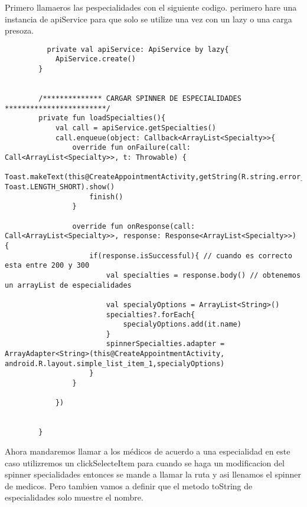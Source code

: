 \documentclass[a4paper]{article}
\begin{document}
	Primero llamaeros las pespecialidades con el siguiente codigo. perimero hare una instancia de apiService para que solo se utilize una vez con un lazy o una carga presoza.
	

		\lstset{style=mystyle,caption=Spinner de especialidades,label=DescriptiveLabel}
	\begin{lstlisting}
		  private val apiService: ApiService by lazy{
			ApiService.create()
		}
		
		
		/************** CARGAR SPINNER DE ESPECIALIDADES ************************/
		private fun loadSpecialties(){
			val call = apiService.getSpecialties()
			call.enqueue(object: Callback<ArrayList<Specialty>>{
				override fun onFailure(call: Call<ArrayList<Specialty>>, t: Throwable) {
					Toast.makeText(this@CreateAppointmentActivity,getString(R.string.error_loading_speialties), Toast.LENGTH_SHORT).show()
					finish()
				}
				
				override fun onResponse(call: Call<ArrayList<Specialty>>, response: Response<ArrayList<Specialty>>) {
					if(response.isSuccessful){ // cuando es correcto esta entre 200 y 300
						val specialties = response.body() // obtenemos un arrayList de especialidades
						
						val specialyOptions = ArrayList<String>()
						specialties?.forEach{
							specialyOptions.add(it.name)
						}
						spinnerSpecialties.adapter = ArrayAdapter<String>(this@CreateAppointmentActivity, android.R.layout.simple_list_item_1,specialyOptions)
					}
				}
				
			})
			
			
		}
	\end{lstlisting}

	Ahora mandaremos llamar a los médicos de acuerdo a una especialidad en este caso utilizremos un clickSelecteItem para cuando se haga un modificacion del spinner specialidades entonces se mande a llamar la ruta y asi llenamos el spinner de medicos. Pero tambien vamos a definir que el metodo toString de especialidades solo muestre el nombre.
	
\end{document}
